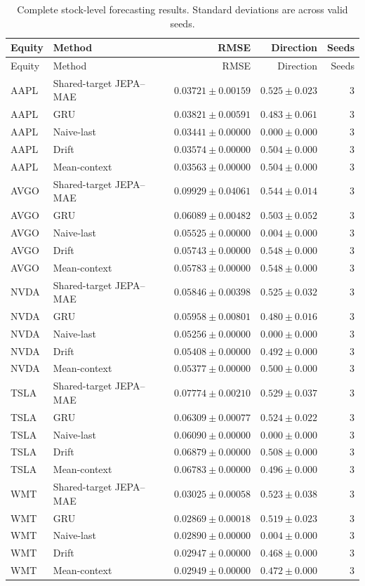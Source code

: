 \begin{longtable}{llrrr}
\caption{Complete stock-level forecasting results. Standard deviations are across valid seeds.}\label{tab:appendix_stock_metrics}\\
\toprule
Equity & Method & RMSE & Direction & Seeds \\
\midrule
\endfirsthead
\toprule
Equity & Method & RMSE & Direction & Seeds \\
\midrule
\endhead
AAPL & Shared-target JEPA--MAE & $0.03721 \pm 0.00159$ & $0.525 \pm 0.023$ & 3 \\
AAPL & GRU & $0.03821 \pm 0.00591$ & $0.483 \pm 0.061$ & 3 \\
AAPL & Naive-last & $0.03441 \pm 0.00000$ & $0.000 \pm 0.000$ & 3 \\
AAPL & Drift & $0.03574 \pm 0.00000$ & $0.504 \pm 0.000$ & 3 \\
AAPL & Mean-context & $0.03563 \pm 0.00000$ & $0.504 \pm 0.000$ & 3 \\
AVGO & Shared-target JEPA--MAE & $0.09929 \pm 0.04061$ & $0.544 \pm 0.014$ & 3 \\
AVGO & GRU & $0.06089 \pm 0.00482$ & $0.503 \pm 0.052$ & 3 \\
AVGO & Naive-last & $0.05525 \pm 0.00000$ & $0.004 \pm 0.000$ & 3 \\
AVGO & Drift & $0.05743 \pm 0.00000$ & $0.548 \pm 0.000$ & 3 \\
AVGO & Mean-context & $0.05783 \pm 0.00000$ & $0.548 \pm 0.000$ & 3 \\
NVDA & Shared-target JEPA--MAE & $0.05846 \pm 0.00398$ & $0.525 \pm 0.032$ & 3 \\
NVDA & GRU & $0.05958 \pm 0.00801$ & $0.480 \pm 0.016$ & 3 \\
NVDA & Naive-last & $0.05256 \pm 0.00000$ & $0.000 \pm 0.000$ & 3 \\
NVDA & Drift & $0.05408 \pm 0.00000$ & $0.492 \pm 0.000$ & 3 \\
NVDA & Mean-context & $0.05377 \pm 0.00000$ & $0.500 \pm 0.000$ & 3 \\
TSLA & Shared-target JEPA--MAE & $0.07774 \pm 0.00210$ & $0.529 \pm 0.037$ & 3 \\
TSLA & GRU & $0.06309 \pm 0.00077$ & $0.524 \pm 0.022$ & 3 \\
TSLA & Naive-last & $0.06090 \pm 0.00000$ & $0.000 \pm 0.000$ & 3 \\
TSLA & Drift & $0.06879 \pm 0.00000$ & $0.508 \pm 0.000$ & 3 \\
TSLA & Mean-context & $0.06783 \pm 0.00000$ & $0.496 \pm 0.000$ & 3 \\
WMT & Shared-target JEPA--MAE & $0.03025 \pm 0.00058$ & $0.523 \pm 0.038$ & 3 \\
WMT & GRU & $0.02869 \pm 0.00018$ & $0.519 \pm 0.023$ & 3 \\
WMT & Naive-last & $0.02890 \pm 0.00000$ & $0.004 \pm 0.000$ & 3 \\
WMT & Drift & $0.02947 \pm 0.00000$ & $0.468 \pm 0.000$ & 3 \\
WMT & Mean-context & $0.02949 \pm 0.00000$ & $0.472 \pm 0.000$ & 3 \\
\bottomrule
\end{longtable}
